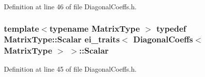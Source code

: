 Definition at line 46 of file Diagonal\-Coeffs.\-h.

\hypertarget{structei__traits_3_01_diagonal_coeffs_3_01_matrix_type_01_4_01_4_af4fc0a9930a5eeec8245da34eead10b6}{
\subsubsection[{Scalar}]{\setlength{\rightskip}{0pt plus 5cm}template$<$typename Matrix\-Type $>$ typedef Matrix\-Type\-::\-Scalar {\bf ei\-\_\-traits}$<$ {\bf Diagonal\-Coeffs}$<$ Matrix\-Type $>$ $>$\-::{\bf Scalar}}}\label{structei__traits_3_01_diagonal_coeffs_3_01_matrix_type_01_4_01_4_af4fc0a9930a5eeec8245da34eead10b6}


Definition at line 45 of file Diagonal\-Coeffs.\-h.



